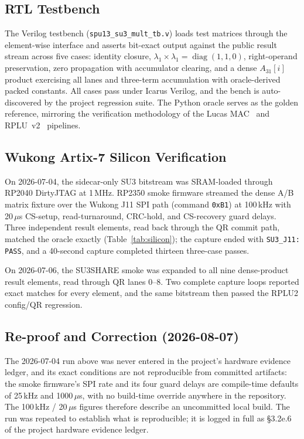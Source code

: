 \documentclass[conference]{IEEEtran}
\begin{document}
\subsection{RTL Testbench}

The Verilog testbench (\texttt{spu13\_su3\_mult\_tb.v}) loads test
matrices through the element-wise interface and asserts bit-exact output
against the public result stream across five cases: identity closure,
$\lambda_1 \times \lambda_1 = \operatorname{diag}(1,1,0)$, right-operand
preservation, zero propagation with accumulator clearing, and a dense
$A_{31}[i]$ product exercising all lanes and three-term accumulation with
oracle-derived packed constants. All cases pass under Icarus Verilog, and
the bench is auto-discovered by the project regression suite. The Python
oracle serves as the golden reference, mirroring the verification
methodology of the Lucas MAC~\cite{lucas2026} and RPLU~v2~\cite{rplu2026}
pipelines.

\subsection{Wukong Artix-7 Silicon Verification}

On 2026-07-04, the sidecar-only SU3 bitstream was SRAM-loaded through
RP2040 DirtyJTAG at 1\,MHz. RP2350 smoke firmware streamed the dense A/B
matrix fixture over the Wukong J11 SPI path (command \texttt{0xB1}) at
100\,kHz with 20\,$\mu$s CS-setup, read-turnaround, CRC-hold, and
CS-recovery guard delays. Three independent result elements, read back
through the QR commit path, matched the oracle exactly
(Table~\ref{tab:silicon}); the capture ended with \texttt{SU3\_J11: PASS},
and a 40-second capture completed thirteen three-case passes.

On 2026-07-06, the SU3SHARE smoke was expanded to all nine dense-product
result elements, read through QR lanes 0--8. Two complete capture loops
reported exact matches for every element, and the same bitstream then
passed the RPLU2 config/QR regression.

\subsection{Re-proof and Correction (2026-08-07)}

The 2026-07-04 run above was never entered in the project's hardware
evidence ledger, and its exact conditions are not reproducible from
committed artifacts: the smoke firmware's SPI rate and its four guard
delays are compile-time defaults of 25\,kHz and 1000\,$\mu$s, with no
build-time override anywhere in the repository. The 100\,kHz /
20\,$\mu$s figures therefore describe an uncommitted local build. The run
was repeated to establish what is reproducible; it is logged in full as
\S3.2e.6 of the project hardware evidence ledger.
\end{document}
